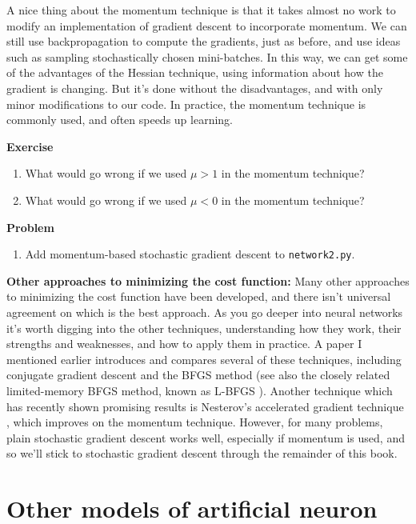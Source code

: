A nice thing about the momentum technique is that it takes almost no work to modify an implementation of gradient descent to incorporate momentum. We can still use backpropagation to compute the gradients, just as before, and use ideas such as sampling stochastically chosen mini-batches. In this way, we can get some of the advantages of the Hessian technique, using information about how the gradient is changing. But it's done without the disadvantages, and with only minor modifications to our code. In practice, the momentum technique is commonly used, and often speeds up learning.

\textbf{Exercise}

\begin{enumerate}
\item What would go wrong if we used $\mu > 1$ in the momentum technique?
\item What would go wrong if we used $\mu < 0$  in the momentum technique? 

\end{enumerate}

\textbf{Problem}

\begin{enumerate}
\item Add momentum-based stochastic gradient descent to \lstinline{network2.py}. 
\end{enumerate}

\textbf{Other approaches to minimizing the cost function:} Many other approaches to minimizing the cost function have been developed, and there isn't universal agreement on which is the best approach. As you go deeper into neural networks it's worth digging into the other techniques, understanding how they work, their strengths and weaknesses, and how to apply them in practice. A paper I mentioned earlier \cite{LeCun:1998:EB:645754.668382} introduces and compares several of these techniques, including conjugate gradient descent and the BFGS method (see also the closely related limited-memory BFGS method, known as L-BFGS \cite{WikiPediaLimitedmemoryBFGS2019}). Another technique which has recently shown promising results is Nesterov's accelerated gradient technique \cite{Sutskever:2013:IIM:3042817.3043064}, which improves on the momentum technique. However, for many problems, plain stochastic gradient descent works well, especially if momentum is used, and so we'll stick to stochastic gradient descent through the remainder of this book.

\section{Other models of artificial neuron}

